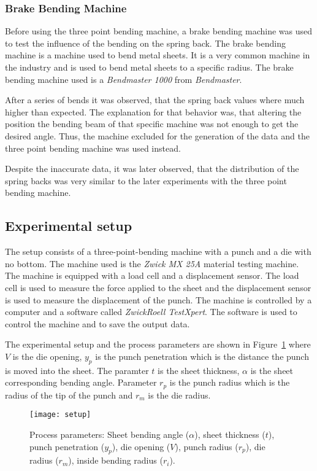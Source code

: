 \subsubsection{Brake Bending Machine}
Before using the three point bending machine, a brake bending machine was used to test the influence of the bending on the spring back. The brake bending machine is a machine used to bend metal sheets. It is a very common machine in the industry and is used to bend metal sheets to a specific radius. The brake bending machine used is a \textit{Bendmaster 1000} from \textit{Bendmaster}.

After a series of bends it was observed, that the spring back values where much higher than expected. The explanation for that behavior was, that altering the position the bending beam of that specific machine was not enough to get the desired angle. Thus, the machine excluded for the generation of the data and the three point bending machine was used instead.

Despite the inaccurate data, it was later observed, that the distribution of the spring backs was very similar to the later experiments with the three point bending machine.


\subsection{Experimental setup}
The setup consists of a three-point-bending machine with a punch and a die with no bottom. The machine used is the \textit{Zwick MX 25A} material testing machine.
The machine is equipped with a load cell and a displacement sensor. The load cell is used to measure the force applied to the sheet and the displacement sensor is used to measure the displacement of the punch.
The machine is controlled by a computer and a software called \textit{ZwickRoell TestXpert}. The software is used to control the machine and to save the output data.

The experimental setup and the process parameters are shown in Figure~\ref{fig:setup} where $V$ is the die opening, $y_p$ is the punch penetration which is the distance the punch is moved into the sheet.
The paramter $t$ is the sheet thickness,  $\alpha$ is the sheet corresponding bending angle. Parameter $r_p$ is the punch radius which is the radius of the tip of the punch and $r_m$ is the die radius.


\begin{figure}[H]
    \centering
    \texttt{[image: setup]}
    \caption{Process parameters: Sheet bending angle ($\alpha$), sheet thickness ($t$), punch penetration ($y_p$), die opening ($V$), punch radius ($r_p$), die radius ($r_m$), inside bending radius ($r_i$).}
    \label{fig:setup}
\end{figure}

